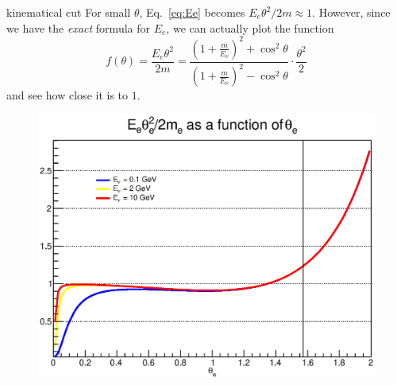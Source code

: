 \documentclass{beamer}
\begin{document}
\begin{frame}[allowframebreaks]{kinematical cut}
  For small $\theta$, Eq.~\eqref{eq:Ee} becomes $E_e\theta^2/2m\approx 1$. However, since we have the \emph{exact} formula for $E_e$, we can actually plot the function
\begin{equation} \label{eq:exact_cut_function}
  f(\theta)=\frac{E_e\theta^2}{2m}=\frac{\left( 1+\frac{m}{E_\nu} \right)^2+\cos^2\theta}{\left( 1+\frac{m}{E_\nu} \right)^2-\cos^2\theta}\cdot\frac{\theta^2}{2}
\end{equation}
and see how close it is to $1$.

\framebreak
\begin{figure}
\centering
  \includegraphics[width=\textwidth]{figures/cut_func_with_angle.eps}
\end{figure}

\end{frame}
\end{document}
